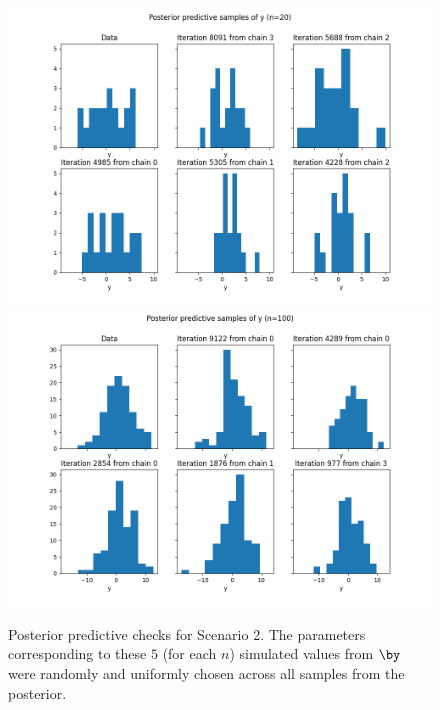 \documentclass[a4paper, 10pt]{article}
\begin{document}
\begin{figure}[htb]
    \begin{center}
        \includegraphics[height=.5\textwidth]{../outputs/artificial_scenarios_n=20/scenario_2/posterior_predictive_check.png}
        \includegraphics[height=.5\textwidth]{../outputs/artificial_scenarios_n=100/scenario_2/posterior_predictive_check.png}
    \end{center}
    \caption[Posterior predictive checks for Scenario 2.]{Posterior predictive checks for Scenario 2. The parameters corresponding to these $ 5$ (for each $ n $) simulated values from $ \by $ were randomly and uniformly chosen across all samples from the posterior.}
    \label{fig: posterior predictive check scenario 2}
\end{figure}
\end{document}
